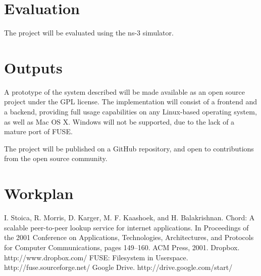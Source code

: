 \documentclass[8pt,a4paper]{article}
\begin{document}
\section{Evaluation}

The project will be evaluated using the ns-3 simulator.

\section{Outputs}

A prototype of the system described will be made available as an open source project under the GPL license. The implementation will consist of a frontend and a backend, providing full usage capabilities on any Linux-based operating system, as well as Mac OS X. Windows will not be supported, due to the lack of a mature port of FUSE. 

The project will be published on a GitHub repository, and open to contributions from the open source community.

\section{Workplan}



\begin{thebibliography}{10}
I. Stoica, R. Morris, D. Karger, M. F. Kaashoek, and
H. Balakrishnan. Chord: A scalable peer-to-peer lookup
service for internet applications. In Proceedings of the 2001
Conference on Applications, Technologies, Architectures,
and Protocols for Computer Communications, pages
149–160. ACM Press, 2001.
Dropbox. http://www.dropbox.com/
FUSE: Filesystem in Userspace. http://fuse.sourceforge.net/ 
Google Drive. http://drive.google.com/start/
\end{thebibliography}
\end{document}
